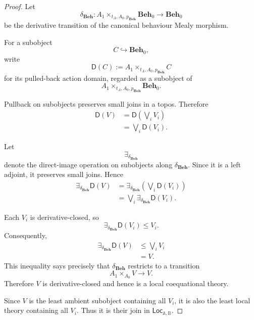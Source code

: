 \begin{proof}
    Let
    \[
        \delta_{\mathbf{Beh}}:
        A_1
        \times_{t_A,A_0,p_{\mathbf{Beh}}}
        \mathbf{Beh}_0
        \to
        \mathbf{Beh}_0
    \]
    be the derivative transition of the canonical behaviour Mealy morphism.

    For a subobject
    \[
        C\hookrightarrow\mathbf{Beh}_0,
    \]
    write
    \[
        \mathsf D(C)
        :=
        A_1
        \times_{t_A,A_0,p_{\mathbf{Beh}}}
        C
    \]
    for its pulled-back action domain, regarded as a subobject of
    \[
        A_1
        \times_{t_A,A_0,p_{\mathbf{Beh}}}
        \mathbf{Beh}_0.
    \]

    Pullback on subobjects preserves small joins in a topos. Therefore
    \[
    \begin{aligned}
        \mathsf D(V)
        &=
        \mathsf D\left(\bigvee_iV_i\right)
        \\
        &=
        \bigvee_i\mathsf D(V_i).
    \end{aligned}
    \]

    Let
    \[
        \exists_{\delta_{\mathbf{Beh}}}
    \]
    denote the direct-image operation on subobjects along
    \(\delta_{\mathbf{Beh}}\). Since it is a left adjoint, it preserves small
    joins. Hence
    \[
    \begin{aligned}
        \exists_{\delta_{\mathbf{Beh}}}
        \mathsf D(V)
        &=
        \exists_{\delta_{\mathbf{Beh}}}
        \left(
            \bigvee_i\mathsf D(V_i)
        \right)
        \\
        &=
        \bigvee_i
        \exists_{\delta_{\mathbf{Beh}}}
        \mathsf D(V_i).
    \end{aligned}
    \]

    Each \(V_i\) is derivative-closed, so
    \[
        \exists_{\delta_{\mathbf{Beh}}}
        \mathsf D(V_i)
        \leq
        V_i.
    \]
    Consequently,
    \[
    \begin{aligned}
        \exists_{\delta_{\mathbf{Beh}}}
        \mathsf D(V)
        &\leq
        \bigvee_iV_i
        \\
        &=
        V.
    \end{aligned}
    \]
    This inequality says precisely that
    \(\delta_{\mathbf{Beh}}\) restricts to a transition
    \[
        A_1
        \times_{A_0}
        V
        \to
        V.
    \]
    Therefore \(V\) is derivative-closed and hence is a local coequational
    theory.

    Since \(V\) is the least ambient subobject containing all \(V_i\), it is
    also the least local theory containing all \(V_i\). Thus it is their join
    in
    \(\mathsf{Loc}_{\mathbb A,\mathbb B}\).
\end{proof}

